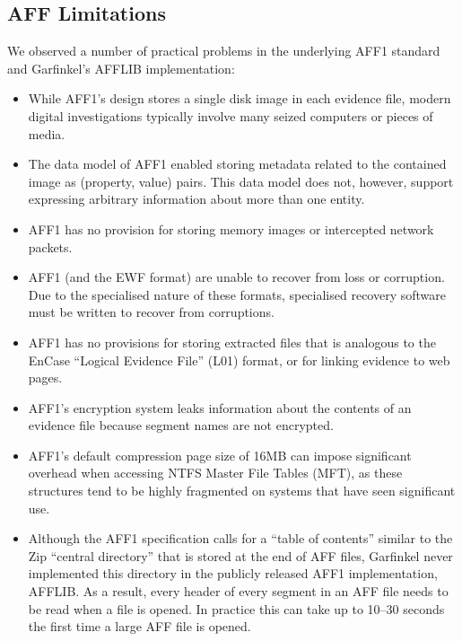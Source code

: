 \documentclass[10pt, conference]{IEEEtran}
\begin{document}
\subsection{AFF Limitations}
We observed a number of practical problems in the underlying AFF1
standard and Garfinkel's AFFLIB implementation:

\begin{itemize}
\item While AFF1's design stores a single disk image in each evidence
  file, modern digital investigations typically involve many seized
  computers or pieces of media. 

\item The data model of AFF1 enabled storing metadata related to the 
  contained image as (property, value) pairs. This data model does
  not, however, support expressing arbitrary information about more
  than one entity.

\item AFF1 has no provision for storing memory images or intercepted
  network packets.

\item AFF1 (and the EWF format) are unable to recover from loss or
  corruption. Due to the specialised nature of these formats,
  specialised recovery software must be written to recover from
  corruptions.

\item AFF1 has no provisions for storing extracted files that is
  analogous to the EnCase ``Logical Evidence File'' (L01) format, or
  for linking evidence to web pages.

\item AFF1's encryption system leaks information about the contents of
  an evidence file because segment names are not encrypted.

\item AFF1's default compression page size of 16MB can impose significant overhead
  when accessing NTFS Master File Tables (MFT), as these structures
  tend to be highly fragmented on systems that have seen significant
  use.

\item Although the AFF1 specification calls for a ``table of contents'' similar
  to the Zip\cite{zip-format} ``central directory'' that is stored at
  the end of AFF files, Garfinkel never implemented this directory in
  the publicly released AFF1 implementation, AFFLIB. As a result,
  every header of every segment in an AFF file needs to be read when a
  file is opened. In practice this can take up to 10--30 seconds the
  first time a large AFF file is opened. 


\end{itemize}
\end{document}
